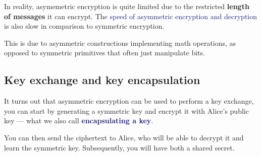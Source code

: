 \documentclass[dvipsnames]{article}
\newcommand{\mycola}{MidnightBlue}
\newcommand{\cola}[1]{\textcolor{\mycola}{#1}}
\newcommand{\Cola}[1]{\textcolor{\mycola}{\textbf{#1}}}
\newcommand\uptodown[3][-o]{\draw[very thick,#1](#2.south) to [out=270,in=90] (#3.north);}
\begin{document}
In reality, asymemetric encryption is quite limited due to the restricted\textbf{ length
of messages} it can encrypt. The \cola{speed of asymmetric encryption and
decryption} is also slow in comparison to symmetric encryption.

This is due to asymmetric constructions implementing math operations, as opposed
to symmetric primitives that often just manipulate bits.

\subsection{Key exchange and key encapsulation}
It turns out that asymmetric encryption can be used to perform a key exchange,
you can start by generating a symmetric key and encrypt it with Alice's public
key --- what we also call \Cola{encapsulating a key}.

\begin{center}
\end{center}

You can then send the ciphertext to Alice, who will be able to decrypt it and
learn the symmetric key. Subsequently, you will have both a shared secret.
\end{document}
